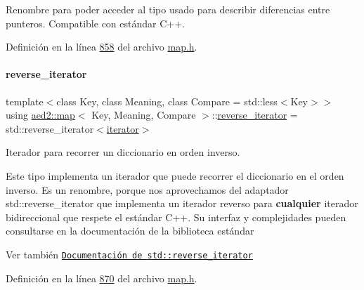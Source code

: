 Renombre para poder acceder al tipo usado para describir diferencias entre punteros. Compatible con estándar C++. 



Definición en la línea \hyperlink{map_8h_source_l00858}{858} del archivo \hyperlink{map_8h_source}{map.\+h}.

\mbox{\label{classaed2_1_1map_a8e6a592062260177fd73b2f9897b1dd5_a8e6a592062260177fd73b2f9897b1dd5}} 
\paragraph{\texorpdfstring{reverse\+\_\+iterator}{reverse\_iterator}}
{\footnotesize\ttfamily template$<$class Key, class Meaning, class Compare = std\+::less$<$\+Key$>$$>$ \\
using \hyperlink{classaed2_1_1map}{aed2\+::map}$<$ Key, Meaning, Compare $>$\+::\hyperlink{classaed2_1_1map_a8e6a592062260177fd73b2f9897b1dd5_a8e6a592062260177fd73b2f9897b1dd5}{reverse\+\_\+iterator} =  std\+::reverse\+\_\+iterator$<$\hyperlink{classaed2_1_1map_1_1iterator}{iterator}$>$}



Iterador para recorrer un diccionario en orden inverso. 

Este tipo implementa un iterador que puede recorrer el diccionario en el orden inverso. Es un renombre, porque nos aprovechamos del adaptador {\ttfamily std\+::reverse\+\_\+iterator} que implementa un iterador reverso para {\bfseries cualquier} iterador bidireccional que respete el estándar C++. Su interfaz y complejidades pueden consultarse en la documentación de la biblioteca estándar

\begin{DoxySeeAlso}{Ver también}
\href{http://en.cppreference.com/w/cpp/iterator/reverse_iterator}{\tt Documentación de {\ttfamily std\+::reverse\+\_\+iterator}} 
\end{DoxySeeAlso}


Definición en la línea \hyperlink{map_8h_source_l00870}{870} del archivo \hyperlink{map_8h_source}{map.\+h}.

\mbox{\label{classaed2_1_1map_aed66a216549d13078a3ea6978ea0b768_aed66a216549d13078a3ea6978ea0b768}} 
